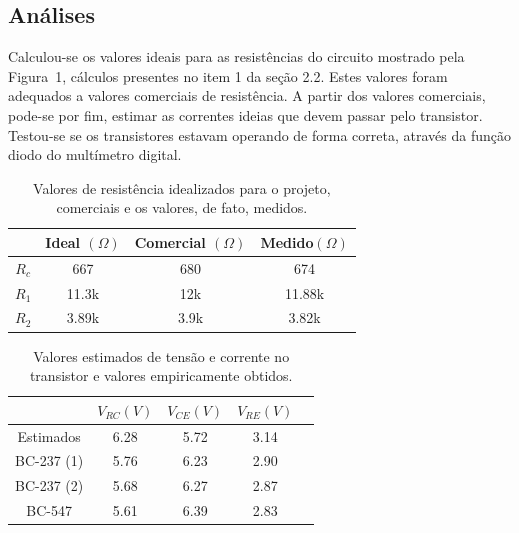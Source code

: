 \documentclass[12pt,a4paper]{article}
\begin{document}
\subsection{Análises}
Calculou-se os valores ideais para as resistências do circuito mostrado pela Figura~1, 
cálculos presentes no item 1 da seção 2.2.  Estes valores foram adequados a valores 
comerciais de resistência. A partir dos valores comerciais, pode-se por fim, estimar 
as correntes ideias que devem  passar pelo transistor. Testou-se 
se os transistores estavam operando de forma correta, através da função diodo do multímetro
digital. 
\begin{table}[htpb]
  \centering
  \caption{Valores de resistência idealizados para o projeto, comerciais e os valores, de fato, medidos.}
  \label{tab:label}

  \begin{tabular}{c c c c}
    \\  \toprule 
    & Ideal $(\Omega)$ &Comercial $(\Omega)$  & Medido$(\Omega)$\\ \midrule
    $R_{c}$ & 667 &680 & 674 \\ \midrule
    $R_1$   &11.3k  &12k & 11.88k \\ \midrule
    $R_2$   &3.89k  &3.9k &3.82k \\ \bottomrule
  \end{tabular}
\end{table}
\begin{table}[htpb]
  \centering
  \caption{Valores estimados de tensão e corrente no transistor e valores empiricamente obtidos.}
  \label{tab:transvalues}
  \begin{tabular}{c c c c c}
    \\  \toprule
    & $V_{RC} (V)$ & $V_{CE} (V) $ & $V_{RE} (V)$  \\ \midrule
    Estimados  & 6.28         & 5.72          & 3.14          \\ \midrule
    BC-237 (1) & 5.76         & 6.23          & 2.90         \\ \midrule
    BC-237 (2) & 5.68         & 6.27          & 2.87          \\ \midrule
    BC-547     & 5.61         & 6.39          & 2.83          \\ \bottomrule
  \end{tabular}
\end{table}
\end{document}
